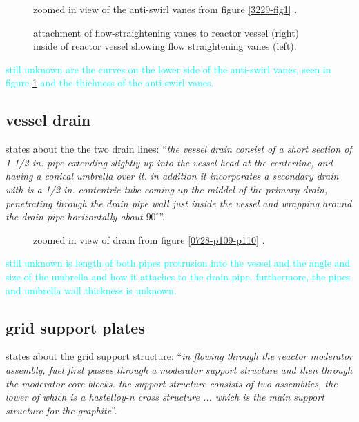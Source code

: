 \documentclass{article}
\begin{document}
\begin{preview}
\begin{figure}[H]
  \centering
  \caption{zoomed in view of the anti-swirl vanes from figure \ref{3229-fig1} \parencite[figure 1]{ornl-tm-3229}.}
  \label{3229-fig1-zoom-strainer}
\end{figure}

\begin{figure}[H]
  \centering
  \caption{attachment of flow-straightening vanes to reactor vessel \parencite[figure 37]{ornl-3708} (right) inside of reactor vessel showing flow straightening vanes \parencite[figure 1.3]{ornl-3369} (left).}
  \label{3369-fig1.3}
\end{figure}

\textcolor{cyan}{still unknown are the curves on the lower side of the anti-swirl vanes, seen in figure \ref{3229-fig1-zoom-strainer} and the thichness of the anti-swirl vanes.}


\subsection{vessel drain}
\label{sec:drain}
\textcite[page 14-15]{ornl-tm-3229} states about the the two drain lines: \enquote{\textit{the vessel drain consist of a short section of 1 1/2 in. pipe extending slightly up into the vessel head at the centerline, and having a conical umbrella over it. in addition it incorporates a secondary drain with is a 1/2 in. contentric tube coming up the middel of the primary drain, penetrating through the drain pipe wall just inside the vessel and wrapping around the drain pipe horizontally about $90^\circ$}}.

\begin{figure}[H]
  \centering
  \caption{zoomed in view of drain from figure \ref{0728-p109-p110} \parencite[page 110]{ornl-tm-0728}.}
\end{figure}

\textcolor{cyan}{still unknown is length of both pipes protrusion into the vessel and the angle and size of the umbrella and how it attaches to the drain pipe. furthermore, the pipes and umbrella wall thickness is unknown.}


\subsection{grid support plates}
\parencite[page 20]{ornl-tm-3229} states about the grid support structure: \enquote{\textit{in flowing through the reactor moderator assembly, fuel first passes through a moderator support structure and then through the moderator core blocks. the support structure consists of two assemblies, the lower of which is a hastelloy-n cross structure ... which is the main support structure for the graphite}}.


\end{preview}
\end{document}
